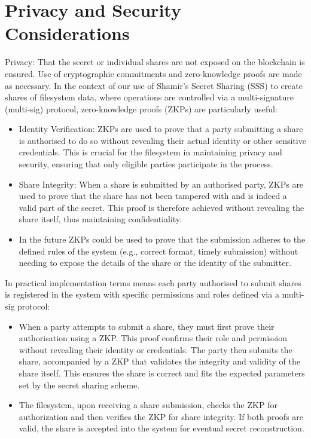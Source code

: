 \documentclass{tufte-handout}
\begin{document}
\section{Privacy and Security Considerations}
Privacy: That the secret or individual shares are not exposed on the blockchain is ensured.
Use of cryptographic commitments and zero-knowledge proofs are made as necessary.
In the context of our use of Shamir's Secret Sharing (SSS) to create shares of filesystem data, where operations are controlled via a multi-signature
(multi-sig) protocol, zero-knowledge proofs (ZKPs) are particularly useful:
\begin{itemize}
  \item Identity Verification: ZKPs are used to prove that a party submitting a share is authorised to do so without revealing their actual
  identity or other sensitive credentials. This is crucial for the filesystem in maintaining privacy and security, ensuring that only eligible parties
  participate in the process.
  \item Share Integrity: When a share is submitted by an authorised party, ZKPs are used to prove that the share has not been tampered with and is indeed
  a valid part of the secret. This proof is therefore achieved without revealing the share itself, thus maintaining confidentiality.
  \item In the future ZKPs could be used to prove that the submission adheres to the defined rules of the system (e.g., correct format, timely submission) without
  needing to expose the details of the share or the identity of the submitter.
\end{itemize}
In practical implementation terms means each party authorised to submit shares is registered in the system with specific permissions and roles defined via a
multi-sig protocol:
\begin{itemize}
  \item When a party attempts to submit a share, they must first prove their authorisation using a ZKP. This proof confirms their role and permission
  without revealing their identity or credentials. The party then submits the share, accompanied by a ZKP that validates the integrity and validity of the share
  itself. This ensures the share is correct and fits the expected parameters set by the secret sharing scheme.
  \item The filesystem, upon receiving a share submission, checks the ZKP for authorization and then verifies the ZKP for share integrity. If both proofs
  are valid, the share is accepted into the system for eventual secret reconstruction.
\end{itemize}
\end{document}
